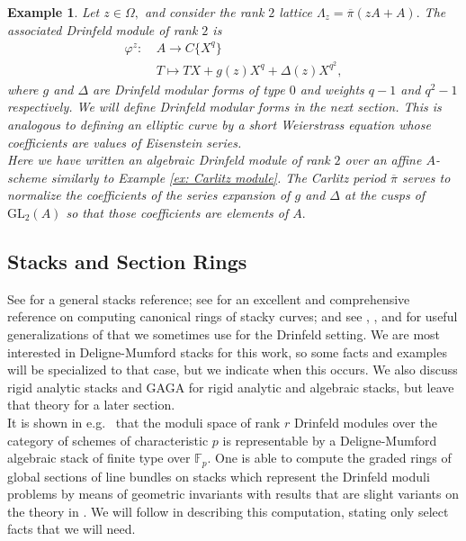 \documentclass[11pt]{amsart}
\newtheorem{example}[theorem]{Example}
\theoremstyle{definition}
\numberwithin{equation}{section}
\newcommand{\GL}{\mathrm{GL}} 	%
\newcommand{\bbF}{\mathbb{F}}		%
\begin{document}
		\begin{example}
			Let $z\in \Omega,$ and consider the rank $2$ lattice $\Lambda_z=\overline{\pi}(zA+A).$ The associated Drinfeld module of rank $2$ is 
			\begin{align*}
				\varphi^z: &~A\to C\{X^q\}\\
				&~T\mapsto TX+g(z)X^q+\Delta(z)X^{q^2},
			\end{align*}
			where $g$ and $\Delta$ are Drinfeld modular forms of type $0$ and weights $q-1$ and $q^2-1$ respectively. We will define Drinfeld modular forms in the next section. This is analogous to defining an elliptic curve by a short Weierstrass equation whose coefficients are values of Eisenstein series.\\
			
			Here we have written an algebraic Drinfeld module of rank $2$ over an affine $A$-scheme similarly to Example \ref{ex: Carlitz module}. The Carlitz period $\overline{\pi}$ serves to normalize the coefficients of the series expansion of $g$ and $\Delta$ at the cusps of $\GL_2(A)$ so that those coefficients are elements of $A.$
		\end{example}
		
		\subsection{Stacks and Section Rings}
		
		See \cite{Alper-Stacks-and-Moduli} for a general stacks reference; see \cite{VZB} for an excellent and comprehensive reference on computing canonical rings of stacky curves; and see \cite{ODorney-canonical-rings-Q-divisors-on-P1}, \cite{Cerchia-Franklin-ODorney-Qdiv-Ell-curves}, and \cite{Landesman-Ruhm-Zhang-Spin-canonical-rings} for useful generalizations of \cite{VZB} that we sometimes use for the Drinfeld setting. We are most interested in Deligne-Mumford stacks for this work, so some facts and examples will be specialized to that case, but we indicate when this occurs. We also discuss rigid analytic stacks and GAGA for rigid analytic and algebraic stacks, but leave that theory for a later section. \\ 
		
		It is shown in e.g.\ \cite[Corollary $1.4.3$]{Laumon-cohomology-Drinfeld-modular-varieties} that the moduli space of rank $r$ Drinfeld modules over the category of schemes of characteristic $p$ is representable by a Deligne-Mumford algebraic stack of finite type over $\bbF_p.$ 
		One is able to compute the graded rings of global sections of line bundles on stacks which represent the Drinfeld moduli problems by means of geometric invariants with results that are slight variants on the theory in \cite{VZB}. We will follow \cite{VZB} in describing this computation, stating only select facts that we will need.\\
		
\end{document}
